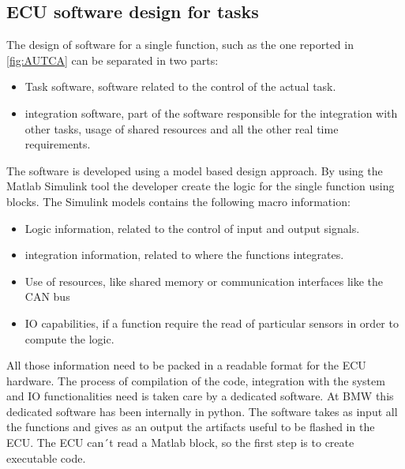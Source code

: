 \documentclass[../main.tex]{subfiles}
\begin{document}
\subsection{ECU software design for tasks}
The design of software for a single function, such as the one reported in \ref{fig:AUTCA} can be separated in two parts:
\begin{itemize}
    \item Task software, software related to the control of the actual task. 
    \item integration software, part of the software responsible for the integration with other tasks, usage of shared resources and all the other real time requirements. 
\end{itemize}
The software is developed using a model based design approach. By using the Matlab Simulink tool the developer create the logic for the single function using blocks. The Simulink models contains the following macro information:
\begin{itemize}
    \item Logic information, related to the control of input and output signals.
    \item integration information, related to where the functions integrates. 
    \item Use of resources, like shared memory or communication interfaces like the CAN bus
    \item IO capabilities, if a function require the read of particular sensors in order to compute the logic. 
\end{itemize}
All those information need to be packed in a readable format for the ECU hardware. The process of compilation of the code, integration with the system and IO functionalities need is taken care by a dedicated software. 
At BMW this dedicated software has been internally in python. The software takes as input all the functions and gives as an output the artifacts useful to be flashed in the ECU. 
The ECU can´t read a Matlab block, so the first step is to create executable code. 
\cleardoublepage
\end{document}
